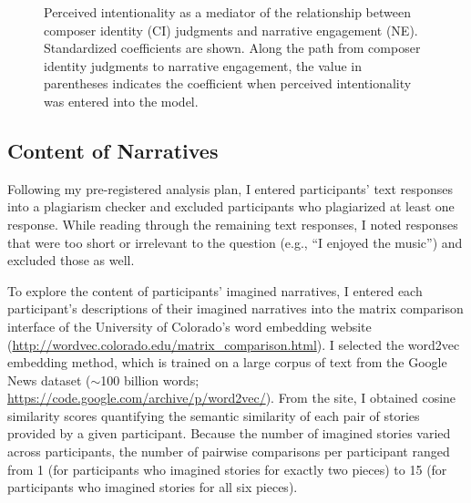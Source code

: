 \documentclass[12pt,twoside]{reedthesis}
\begin{document}
\begin{figure}[h!tbp]
	\centering
{}
  \caption{Perceived intentionality as a mediator of the relationship between composer identity (CI) judgments and narrative engagement (NE). Standardized coefficients are shown. Along the path from composer identity judgments to narrative engagement, the value in parentheses indicates the coefficient when perceived intentionality was entered into the model.
  }
  \label{fig-intentionality-ne}
\end{figure}

\subsection{Content of Narratives}

Following my pre-registered analysis plan, I entered participants’ text responses into a plagiarism checker and excluded participants who plagiarized at least one response. While reading through the remaining text responses, I noted responses that were too short or irrelevant to the question (e.g., “I enjoyed the music”) and excluded those as well.

To explore the content of participants’ imagined narratives, I entered each participant’s descriptions of their imagined narratives into the matrix comparison interface of the University of Colorado’s word embedding website (\url{http://wordvec.colorado.edu/matrix_comparison.html}). I selected the word2vec embedding method, which is trained on a large corpus of text from the Google News dataset ($\sim$100 billion words; \url{https://code.google.com/archive/p/word2vec/}). From the site, I obtained cosine similarity scores quantifying the semantic similarity of each pair of stories provided by a given participant. Because the number of imagined stories varied across participants, the number of pairwise comparisons per participant ranged from 1 (for participants who imagined stories for exactly two pieces) to 15 (for participants who imagined stories for all six pieces).
\end{document}
